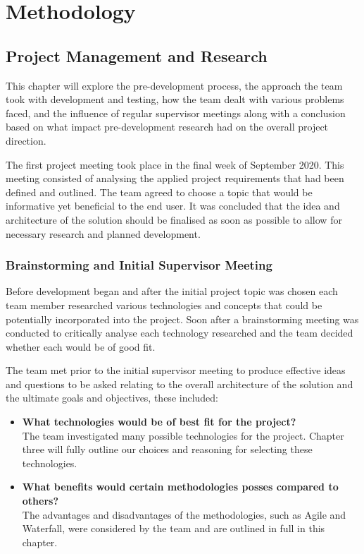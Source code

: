 \chapter{Methodology}
\section{Project Management and Research}
This chapter will explore the pre-development process, the approach the team took with development and testing, how the team dealt with various problems faced, and the influence of regular supervisor meetings along with a conclusion based on what impact pre-development research had on the overall project direction.

\vspace{5mm} %

The first project meeting took place in the final week of September 2020. This meeting consisted of analysing the applied project requirements that had been defined and outlined. The team agreed to choose a topic that would be informative yet beneficial to the end user. It was concluded that the idea and architecture of the solution should be finalised as soon as possible to allow for necessary research and planned development.


\subsection{Brainstorming and Initial Supervisor Meeting}
Before development began and after the initial project topic was chosen each team member researched various technologies and concepts that could be potentially incorporated into the project. Soon after a brainstorming meeting was conducted to critically analyse each technology researched and the team decided whether each would be of good fit.

\vspace{5mm} %

The team met prior to the initial supervisor meeting to produce effective ideas and questions to be asked relating to the overall architecture of the solution and the ultimate goals and objectives, these included:
\vspace{5mm} %

\begin{itemize}


    \item \textbf{What technologies would be of best fit for the project?} \\
The team investigated many possible technologies for the project. Chapter three will fully outline our choices and reasoning for selecting these technologies.

    \item \textbf{What benefits would certain methodologies posses compared to others?}\\
The advantages and disadvantages of the methodologies, such as Agile and Waterfall, were considered by the team and are outlined in full in this chapter.
\end{itemize}

